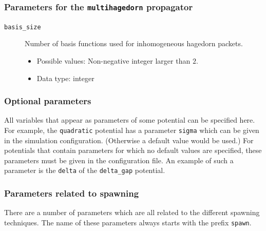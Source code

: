 \documentclass[a4paper,10pt]{report}
\begin{document}
\subsubsection{Parameters for the \texttt{multihagedorn} propagator}

\begin{description}
  \item[\texttt{basis\_size}] Number of basis functions used for inhomogeneous hagedorn packets.
  \begin{itemize}
    \item Possible values: Non-negative integer larger than $2$.
    \item Data type: integer
  \end{itemize}
\end{description}

\subsubsection{Optional parameters}

All variables that appear as parameters of some potential can be specified
here. For example, the \texttt{quadratic} potential has a parameter \texttt{sigma}
which can be given in the simulation configuration. (Otherwise a default value
would be used.) For potentials that contain parameters for which no default
values are specified, these parameters must be given in the configuration file.
An example of such a parameter is the \texttt{delta} of the \texttt{delta\_gap} potential.

\subsubsection{Parameters related to spawning}

There are a number of parameters which are all related to the different
spawning techniques. The name of these parameters always starts with the prefix
\texttt{spawn}.
\end{document}
